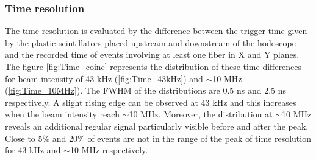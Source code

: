 \documentclass[a4paper,11pt]{article}
\begin{document}
\subsubsection{Time resolution}
The time resolution is evaluated by the difference between the trigger time given by the plastic scintillators placed upstream and downstream of the hodoscope and the recorded time of events involving at least one fiber in X and Y planes. The figure \ref{fig:Time_coinc} represents the distribution of these time differences for beam intensity of 43 kHz (\ref{fig:Time_43kHz}) and $\sim$10 MHz (\ref{fig:Time_10MHz}). The FWHM of the distributions are 0.5 ns and 2.5 ns respectively. A slight rising edge can be observed at 43 kHz and this increases when the beam intensity reach $\sim$10 MHz. Moreover, the distribution at $\sim$10 MHz reveals an additional regular signal particularly visible before and after the peak. Close to 5\% and 20\% of events are not in the range of the peak of time resolution for 43 kHz and $\sim$10 MHz respectively.
\label{Time_resolution}
\end{document}
